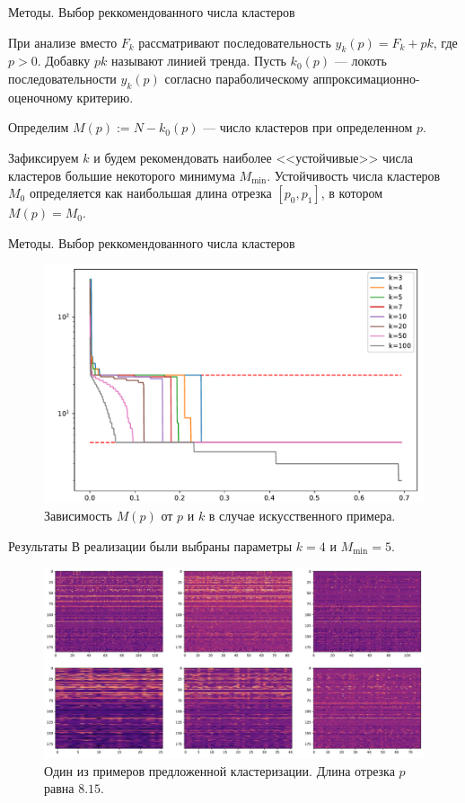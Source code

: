 \documentclass{beamer}
\begin{document}
\begin{frame}{Методы. Выбор реккомендованного числа кластеров}
  \vfill

  При анализе вместо $F_{k}$ рассматривают последовательность
  $y_{k}(p)=F_{k}+pk$, где $p>0$. Добавку $pk$ называют линией тренда. Пусть
  $k_0(p)$ --- локоть последовательности $y_{k}(p)$ согласно параболическому
  аппроксимационно-оценочному критерию.

  \vfill

  Определим $M(p):=N-k_0(p)$ --- число кластеров при определенном $p$.

  \vfill

  Зафиксируем $k$ и будем рекомендовать наиболее <<устойчивые>> числа кластеров
  большие некоторого минимума $M_{\min}$. Устойчивость числа кластеров $M_0$
  определяется как наибольшая длина отрезка $[p_0,p_1]$, в котором
  $M(p)=M_0$.

  \vfill
\end{frame}

\begin{frame}{Методы. Выбор реккомендованного числа кластеров}
  \begin{figure}
    \includegraphics[width=1.0\textwidth]{./figures/trend-analysis.pdf}

    \caption{Зависимость $M(p)$ от $p$ и $k$ в случае искусственного примера.}
  \end{figure}
\end{frame}

\begin{frame}{Результаты}
  В реализации были выбраны параметры $k=4$ и $M_{\min}=5$.

  \begin{figure}
    \includegraphics[width=1.0\textwidth]{./figures/result.pdf}

    \caption{Один из примеров предложенной кластеризации. Длина отрезка $p$
      равна $8.15$.}
  \end{figure}
\end{frame}
\end{document}

